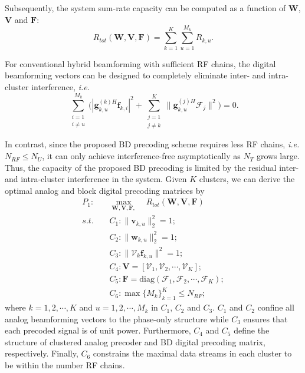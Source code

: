 \documentclass[conference]{IEEEtran}
\begin{document}
{Subsequently, the system sum-rate capacity can be computed as a function of $\bm{W}$, ${\bm V}$ and ${\bm F}$:
\begin{equation}
R_{tot}(\bm{W}, \bm{V}, \bm{F})=\sum_{k=1}^{K}\sum_{u=1}^{M_k}R_{k,u}.
\end{equation}

For conventional hybrid beamforming with sufficient RF chains, the digital beamforming vectors can be designed to completely eliminate inter- and intra-cluster interference, {\em i.e.}
\begin{equation}
 \displaystyle\sum_{\substack{i=1 \\ i\neq u}}^{M_k}\Big(|{\bm{g}}_{k,u}^{(k)H}\bm{f}_{k,i}|^2+\displaystyle\sum_{\substack{j=1\\j\neq k}}^{K}\|\bm{g}_{k,u}^{(j)H}\bm{\mathcal{F}}_j\|^2\Big)={0}.
\end{equation}

In contrast, since the proposed BD precoding scheme requires less RF chains, {\em i.e.} $N_{RF}\leq N_U$, it can only achieve interference-free asymptotically as $N_T$ grows large. Thus, the capacity of the proposed BD precoding is limited by the residual inter- and intra-cluster interference in the system. Given $K$ clusters, we can derive the optimal analog and block digital precoding matrices by
\begin{align}\label{eq:maxsumrate}
P_1: \quad&\max_{\bm W, \bm{V},\bm F, }\quad R_{tot}(\bm{W}, \bm{V}, \bm{F})\\ \nonumber
s.t. \quad&C_1: \|\bm{v}_{k,u}\|^2_2=1; \\
&C_2: \|\bm{w}_{k,u}\|^2_2=1;\nonumber\\
&C_3: \|\bm{\mathcal{V}}_k \bm{f}_{k,u}\|^2=1;\nonumber\\
&C_4: \bm{V} = [\bm{\mathcal{V}}_1, \bm{\mathcal{V}}_2, \cdots, \bm{\mathcal{V}}_K];\nonumber\\
&C_5: \bm{F} = \text{diag}(\bm{\mathcal{F}}_1, \bm{\mathcal{F}}_2, \cdots, \bm{\mathcal{F}}_{K});\nonumber\\
&C_6: \max \{M_k\}_{k=1}^K \leq N_{RF};\nonumber
\end{align}
where $k=1,2,\cdots,K$ and $u = 1, 2, \cdots, M_k$ in $C_1$, $C_2$ and $C_3$. $C_1$ and $C_2$ confine all analog beamforming vectors to the phase-only structure while $C_3$ ensures that each precoded signal is of unit power. Furthermore, $C_4$ and $C_5$ define the structure of clustered analog precoder and BD digital precoding matrix, respectively. Finally,  $C_6$ constrains the maximal data streams in each cluster to be within the number RF chains.

}
\end{document}
